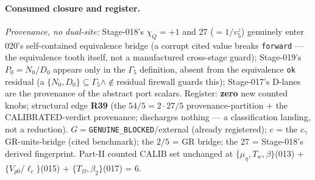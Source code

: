 \paragraph{Consumed closure and register.}
\emph{Provenance, no dual-site:} Stage-018's \(\chi_Q=+1\) and \(27\) (\(=1/v_5^z\)) genuinely enter 020's
self-contained equivalence bridge (a corrupt cited value breaks \texttt{forward} --- the equivalence tooth
itself, not a manufactured cross-stage guard); Stage-019's \(P_0=N_0/D_0\) appears only in the \(\Gamma_5\)
definition, absent from the equivalence \texttt{ok} residual (a \(\{N_0,D_0\}\subseteq\Gamma_5\wedge\notin\)residual
firewall guards this); Stage-017's D-lanes are the provenance of the abstract port scalars. Register:
\textbf{zero} new counted knobs; structural edge \textbf{R39} (the \(54/5=2\cdot27/5\) provenance-partition
+ the CALIBRATED-verdict provenance; discharges nothing --- a classification landing, not a reduction).
\(G=\)\texttt{GENUINE\_BLOCKED}/external (already registered); \(c\) = the \(c_\gamma\) GR-units-bridge (cited
benchmark); the \(2/5\) = GR bridge; the \(27\) = Stage-018's derived fingerprint. Part-II counted CALIB set
unchanged at \(\{\mu_\eta,T_w,\beta\}\)(013) + \(\{V_{p0}/\ell_c\}\)(015) + \(\{T_\Omega,\beta_2\}\)(017) = 6.

